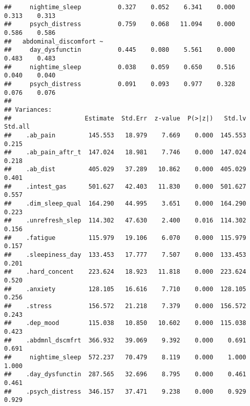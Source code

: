 \documentclass[
  man]{apa6}
\begin{document}
\begin{verbatim}
##     nightime_sleep          0.327    0.052    6.341    0.000    0.313    0.313
##     psych_distress          0.759    0.068   11.094    0.000    0.586    0.586
##   abdominal_discomfort ~                                                      
##     day_dysfunctin          0.445    0.080    5.561    0.000    0.483    0.483
##     nightime_sleep          0.038    0.059    0.650    0.516    0.040    0.040
##     psych_distress          0.091    0.093    0.977    0.328    0.076    0.076
## 
## Variances:
##                    Estimate  Std.Err  z-value  P(>|z|)   Std.lv  Std.all
##    .ab_pain         145.553   18.979    7.669    0.000  145.553    0.215
##    .ab_pain_aftr_t  147.024   18.981    7.746    0.000  147.024    0.218
##    .ab_dist         405.029   37.289   10.862    0.000  405.029    0.401
##    .intest_gas      501.627   42.403   11.830    0.000  501.627    0.557
##    .dim_sleep_qual  164.290   44.995    3.651    0.000  164.290    0.223
##    .unrefresh_slep  114.302   47.630    2.400    0.016  114.302    0.156
##    .fatigue         115.979   19.106    6.070    0.000  115.979    0.157
##    .sleepiness_day  133.453   17.777    7.507    0.000  133.453    0.201
##    .hard_concent    223.624   18.923   11.818    0.000  223.624    0.520
##    .anxiety         128.105   16.616    7.710    0.000  128.105    0.256
##    .stress          156.572   21.218    7.379    0.000  156.572    0.243
##    .dep_mood        115.038   10.850   10.602    0.000  115.038    0.423
##    .abdmnl_dscmfrt  366.932   39.069    9.392    0.000    0.691    0.691
##     nightime_sleep  572.237   70.479    8.119    0.000    1.000    1.000
##    .day_dysfunctin  287.565   32.696    8.795    0.000    0.461    0.461
##    .psych_distress  346.157   37.471    9.238    0.000    0.929    0.929
\end{verbatim}
\end{document}
